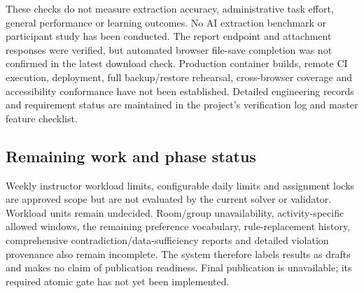 \documentclass[
  11pt,a4paper,oneside]{report}
\begin{document}
These checks do not measure extraction accuracy, administrative task effort, general performance or learning outcomes. No AI extraction benchmark or participant study has been conducted. The report endpoint and attachment responses were verified, but automated browser file-save completion was not confirmed in the latest download check. Production container builds, remote CI execution, deployment, full backup/restore rehearsal, cross-browser coverage and accessibility conformance have not been established. Detailed engineering records and requirement status are maintained in the project's verification log and master feature checklist.

\subsection{Remaining work and phase status}
Weekly instructor workload limits, configurable daily limits and assignment locks are approved scope but are not evaluated by the current solver or validator. Workload units remain undecided. Room/group unavailability, activity-specific allowed windows, the remaining preference vocabulary, rule-replacement history, comprehensive contradiction/data-sufficiency reports and detailed violation provenance also remain incomplete. The system therefore labels results as drafts and makes no claim of publication readiness. Final publication is unavailable; its required atomic gate has not yet been implemented.
\end{document}
